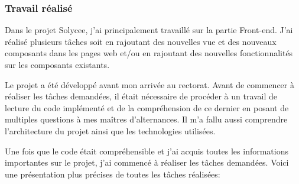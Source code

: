 \documentclass[12pt]{article}
\begin{document}
\subsubsection{Travail réalisé}

Dans le projet Solycee, j'ai principalement travaillé sur la partie Front-end. J'ai réalisé plusieurs tâches soit en rajoutant des nouvelles vue et des nouveaux composants dans les pages web et/ou en rajoutant des nouvelles fonctionnalités sur les composants existants.

Le projet a été développé avant mon arrivée au rectorat. Avant de commencer à réaliser les tâches demandées, il était nécessaire de procéder à un travail de lecture du code implémenté et de la compréhension de ce dernier en posant de multiples questions à mes maîtres d'alternances. Il m'a fallu aussi comprendre l'architecture du projet ainsi que les technologies utilisées.

Une fois que le code était compréhensible et j'ai acquis toutes les informations importantes sur le projet, j'ai commencé à réaliser les tâches demandées.  Voici une présentation plus précises de toutes les tâches réalisées:
\end{document}
